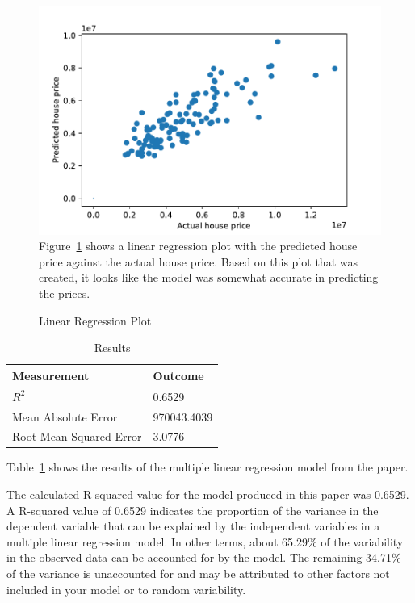 \documentclass[12pt]{article}
\begin{document}
\begin{figure}[h!]
    \caption{Linear Regression Plot}
    \includegraphics[width=1\textwidth]{linear_regression_plot.pdf}
    \label{fig:regression_plot}
Figure~\ref{fig:regression_plot} shows a linear regression plot with the predicted house price against the actual house price. Based on this plot that was created, it looks like the model was somewhat accurate in predicting the prices. 
\end{figure}

\begin{table}[h!]
\caption{Results}
  \label{tab:re}
 \begin{center} 
\begin{tabular}{ll}
  \toprule
Measurement & Outcome \\
  \midrule
\(R^2\) & 0.6529 \\ 
Mean Absolute Error & 970043.4039 \\
Root Mean Squared Error & 3.0776 \\
   \bottomrule
\end{tabular}\par
\end{center}
Table~\ref{tab:re} shows the results of the multiple linear regression model from the paper.
\end{table}

The calculated R-squared value for the model produced in this paper was 0.6529. A R-squared value of 0.6529 indicates the proportion of the variance in the dependent variable that can be explained by the independent variables in a multiple linear regression model. In other terms, about 65.29\% of the variability in the observed data can be accounted for by the model. The remaining 34.71\% of the variance is unaccounted for and may be attributed to other factors not included in your model or to random variability.
\end{document}
